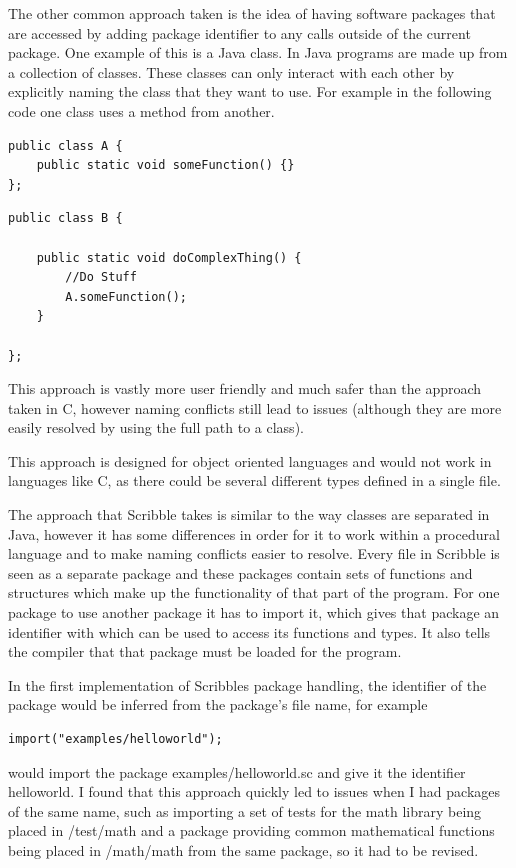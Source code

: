 \documentclass[]{final_report}
\begin{document}
The other common approach taken is the idea of having software packages that are accessed by adding  package identifier to any calls outside of the current package. One example of this is a Java class. In Java programs are made up from a collection of classes. These classes can only interact with each other by explicitly naming the class that they want to use. For example in the following code one class uses a method from another.

\begin{verbatim}
public class A {
    public static void someFunction() {}
};
\end{verbatim}

\begin{verbatim}
public class B {

    public static void doComplexThing() {
        //Do Stuff
        A.someFunction();
    }

};
\end{verbatim}

This approach is vastly more user friendly and much safer than the approach taken in C, however naming conflicts still lead to issues (although they are more easily resolved by using the full path to a class).

This approach is designed for object oriented languages and would not work in languages like C, as there could be several different types defined in a single file.

The approach that Scribble takes is similar to the way classes are separated in Java, however it has some differences in order for it to work within a procedural language and to make naming conflicts easier to resolve. Every file in Scribble is seen as a separate package and these packages contain sets of functions and structures which make up the functionality of that part of the program. For one package to use another package it has to import it, which gives that package an identifier with which can be used to access its functions and types. It also tells the compiler that that package must be loaded for the program.

In the first implementation of Scribbles package handling, the identifier of the package would be inferred from the package's file name, for example \begin{verbatim}import("examples/helloworld");\end{verbatim} would import the package examples/helloworld.sc and give it the identifier helloworld. I found that this approach quickly led to issues when I had packages of the same name, such as importing a set of tests for the math library being placed in /test/math and a package providing common mathematical functions being placed in /math/math from the same package, so it had to be revised.
\end{document}
